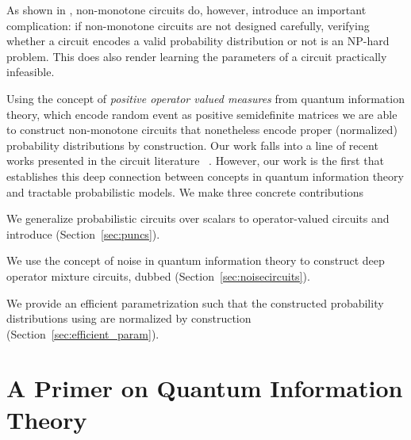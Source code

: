 As shown in \citep{harviainen2023inference,agarwalprobabilistic}, non-monotone circuits do, however, introduce an important complication: if non-monotone circuits are not designed carefully, verifying whether a circuit encodes a valid probability distribution or not is an NP-hard problem. This does also render learning the parameters of a circuit practically infeasible.

Using the concept of \textit{positive operator valued measures} from quantum information theory, which encode random event as positive semidefinite matrices we are able to construct non-monotone circuits that nonetheless encode proper (normalized) probability distributions by construction.
Our work falls into a line of recent works presented in the circuit literature ~\citep{sladek2023encoding,loconte2024subtractive,wangrelationship,loconte2024sum}. However, our work is the first that establishes this deep connection between concepts in quantum information theory and tractable probabilistic models. We make three concrete contributions
\begin{enumerate*}
	\item We generalize probabilistic circuits over scalars to operator-valued circuits and introduce \puncs (Section~\ref{sec:puncs}).
	\item We use the concept of noise in quantum information theory to construct deep operator mixture circuits, dubbed \noisepuncs (Section~\ref{sec:noisecircuits}).
	\item We provide an efficient parametrization such that the constructed probability distributions using \puncs are normalized by construction (Section~\ref{sec:efficient_param}).
\end{enumerate*}







\section{A Primer on Quantum Information Theory}
\label{sec:qit}


